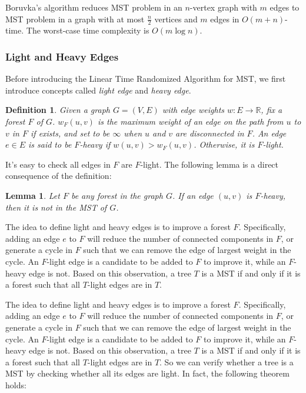 \documentclass[11pt]{article}
\theoremstyle{plain}
\newtheorem{lemma}{Lemma}[section]
\newtheorem{definition}{Definition}[section]
\begin{document}
Boruvka's algorithm reduces MST problem in an $n$-vertex graph with $m$ edges to MST problem in a graph with at most $\frac{n}{2}$ vertices and $m$ edges in $O(m+n)$-time. The worst-case time complexity is $O(m\log n)$.

\subsubsection{Light and Heavy Edges}

Before introducing the Linear Time Randomized Algorithm for MST, we first introduce concepts called \textit{light edge} and \textit{heavy edge}.

\begin{definition}
    Given a graph $G=(V,E)$ with edge weights $w:E\to \mathbb{R}$, fix a forest $F$ of $G$. $w_F(u,v)$ is the maximum weight of an edge on the path from $u$ to $v$ in $F$ if exists, and set to be $\infty$ when $u$ and $v$ are disconnected in $F$. An edge $e\in E$ is said to be $F$-\textit{heavy} if $w(u,v)>w_F(u,v)$. Otherwise, it is $F$-\textit{light}.
\end{definition}

It's easy to check all edges in $F$ are $F$-light. The following lemma is a direct consequence of the definition:

\begin{lemma}
    Let $F$ be any forest in the graph $G$. If an edge $(u,v)$ is $F$-heavy, then it is not in the MST of $G$.
\end{lemma}

The idea to define light and heavy edges is to improve a forest $F$. Specifically, adding an edge $e$ to $F$ will reduce the number of connected components in $F$, or generate a cycle in $F$ such that we can remove the edge of largest weight in the cycle. An $F$-light edge is a candidate to be added to $F$ to improve it, while an $F$-heavy edge is not. Based on this observation, a tree $T$ is a MST if and only if it is a forest such that all $T$-light edges are in $T$.

The idea to define light and heavy edges is to improve a forest $F$. Specifically, adding an edge $e$ to $F$ will reduce the number of connected components in $F$, or generate a cycle in $F$ such that we can remove the edge of largest weight in the cycle. An $F$-light edge is a candidate to be added to $F$ to improve it, while an $F$-heavy edge is not. Based on this observation, a tree $T$ is a MST if and only if it is a forest such that all $T$-light edges are in $T$. So we can verify whether a tree is a MST by checking whether all its edges are light. In fact, the following theorem holds:
\end{document}
